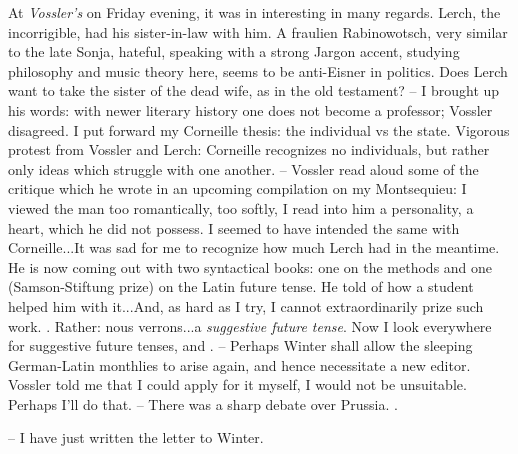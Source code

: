 At \textit{Vossler's} on Friday evening, it was in interesting in many regards. Lerch, the incorrigible, had his sister-in-law with him. A fraulien Rabinowotsch, very similar to the late Sonja, hateful, speaking with a strong Jargon accent, studying philosophy and music theory here, seems to be anti-Eisner in politics. Does Lerch want to take the sister of the dead wife, as in the old testament? -- I brought up his words: with newer literary history one does not become a professor; Vossler disagreed. I put forward my  Corneille thesis: the individual vs the state. Vigorous protest from Vossler and Lerch: Corneille recognizes no individuals, but rather only ideas which struggle with one another. -- Vossler read aloud some of the critique which he wrote in an upcoming compilation on my Montsequieu: I viewed the man too romantically, too softly, I read into him a personality, a heart, which he did not possess. I seemed to have intended the same with Corneille...It was sad for me to recognize how much Lerch had  in the meantime. He is now coming out with two syntactical books: one on the methods and one (Samson-Stiftung prize) on the Latin future tense. He told of how a student helped him with it...And, as hard as I try, I cannot extraordinarily prize such work. . Rather: nous verrons...a \textit{suggestive future tense}. Now I look everywhere for suggestive future tenses, and . -- Perhaps Winter shall allow the sleeping German-Latin monthlies to arise again, and hence necessitate a new editor. Vossler told me that I could apply for it myself, I would not be unsuitable. Perhaps I'll do that. -- There was a sharp debate over Prussia. . 

-- I have just written the letter to Winter.

\missing

